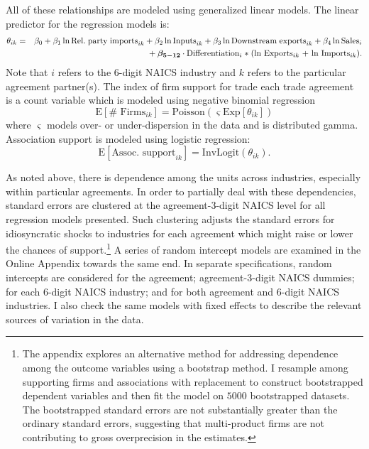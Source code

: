 \documentclass[hidelinks,12pt,letter]{article}
\begin{document}
All of these relationships are modeled using generalized linear models. The linear predictor for the regression models is:
\begin{eqnarray*}
\theta_{ik} & = & \beta_0 + \beta_1\ln \mathrm{Rel.\phantom{'}party\phantom{'}imports}_{ik} + \beta_2\ln \mathrm{Inputs}_{ik} +\beta_3\ln\mathrm{Downstream\phantom{'}exports}_{ik} + \beta_4 \ln \mathrm{Sales}_{i}\\
&  & \phantom{\beta_0} + \boldsymbol{\beta_{5-12}}\cdot\text{Differentiation$_{i}$\phantom{'}$*$\phantom{'}($\ln$ Exports$_{ik}$ $ +$ $\ln$ Imports$_{ik}$)}. 
\end{eqnarray*} 
Note that $i$ refers to the 6-digit NAICS industry and $k$ refers to the particular agreement partner(s). The index of firm support for trade each trade agreement is a count variable which is modeled using negative binomial regression
$$ \mathrm{E}[\# \phantom{'}\mathrm{Firms}_{ik}] = \mathrm{Poisson}(\varsigma \mathrm{Exp}[{\theta}_{ik}])$$ 
where $\varsigma$ models over- or under-dispersion in the data and is distributed gamma. Association support is modeled using logistic regression:
$$ \mathrm{E}[\text{Assoc. support}_{ik}] = \mathrm{InvLogit}(\theta_{ik}). $$ 

As noted above, there is dependence among the units across industries, especially within particular agreements. In order to partially deal with these dependencies, standard errors are clustered at the agreement-3-digit NAICS level for all regression models presented. Such clustering adjusts the standard errors for idiosyncratic shocks to industries for each agreement which might raise or lower the chances of support.\footnote{The appendix explores an alternative method for addressing dependence among the outcome variables using a bootstrap method. I resample among supporting firms and associations with replacement to construct bootstrapped dependent variables and then fit the model on $5000$ bootstrapped datasets. The bootstrapped standard errors are not substantially greater than the ordinary standard errors, suggesting that multi-product firms are not contributing to gross overprecision in the estimates.} A series of random intercept models are examined in the Online Appendix towards the same end. In separate specifications, random intercepts are considered for the agreement; agreement-3-digit NAICS dummies; for each 6-digit NAICS industry; and for both agreement and 6-digit NAICS industries. I also check the same models with fixed effects to describe the relevant sources of variation in the data. 
\end{document}

